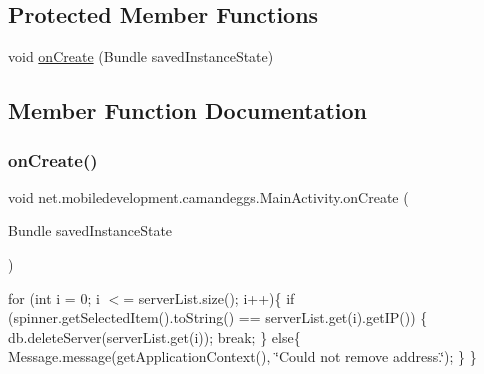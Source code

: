 \subsection*{Protected Member Functions}
\begin{DoxyCompactItemize}
\item 
void \hyperlink{classnet_1_1mobiledevelopment_1_1camandeggs_1_1_main_activity_a7e78ddf7c51cf7932de66127ed304ef0}{on\+Create} (Bundle saved\+Instance\+State)
\end{DoxyCompactItemize}


\subsection{Member Function Documentation}
\mbox{\label{classnet_1_1mobiledevelopment_1_1camandeggs_1_1_main_activity_a7e78ddf7c51cf7932de66127ed304ef0}} 
\subsubsection{\texorpdfstring{on\+Create()}{onCreate()}}
{\footnotesize\ttfamily void net.\+mobiledevelopment.\+camandeggs.\+Main\+Activity.\+on\+Create (\begin{DoxyParamCaption}\item[{Bundle}]{saved\+Instance\+State }\end{DoxyParamCaption})\hspace{0.3cm}{\ttfamily [protected]}}

for (int i = 0; i $<$= server\+List.\+size(); i++)\{ if (spinner.\+get\+Selected\+Item().to\+String() == server\+List.\+get(i).get\+I\+P()) \{ db.\+delete\+Server(server\+List.\+get(i)); break; \} else\{ Message.\+message(get\+Application\+Context(), \char`\"{}\+Could not remove address.\char`\"{}); \} \}\mbox{\label{classnet_1_1mobiledevelopment_1_1camandeggs_1_1_main_activity_ab170f26993d4cca2a6932e5d7e780155}} 
